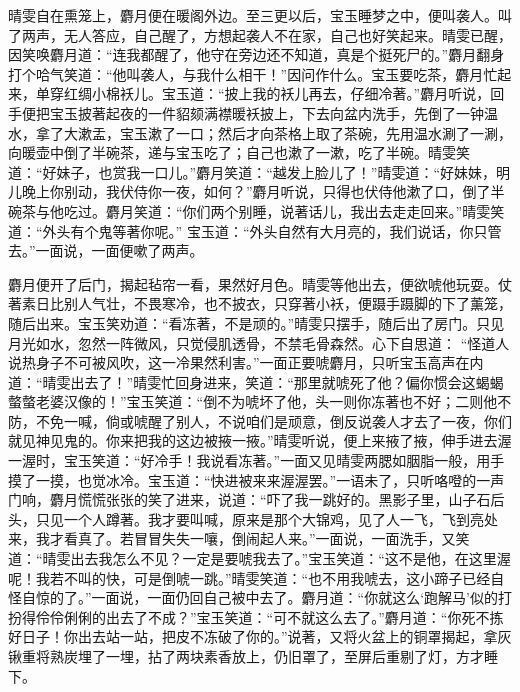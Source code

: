 \begin{parag}


    晴雯自在熏笼上，麝月便在暖阁外边。至三更以后，宝玉睡梦之中，便叫袭人。叫了两声，无人答应，自己醒了，方想起袭人不在家，自己也好笑起来。晴雯已醒，因笑唤麝月道：“连我都醒了，他守在旁边还不知道，真是个挺死尸的。”麝月翻身打个哈气笑道：“他叫袭人，与我什么相干！”因问作什么。宝玉要吃茶，麝月忙起来，单穿红绸小棉袄儿。宝玉道：“披上我的袄儿再去，仔细冷著。”麝月听说，回手便把宝玉披著起夜的一件貂颏满襟暖袄披上，下去向盆内洗手，先倒了一钟温水，拿了大漱盂，宝玉漱了一口；然后才向茶格上取了茶碗，先用温水涮了一涮，向暖壶中倒了半碗茶，递与宝玉吃了；自己也漱了一漱，吃了半碗。晴雯笑道：“好妹子，也赏我一口儿。”麝月笑道：“越发上脸儿了！”晴雯道：“好妹妹，明儿晚上你别动，我伏侍你一夜，如何？”麝月听说，只得也伏侍他漱了口，倒了半碗茶与他吃过。麝月笑道：“你们两个别睡，说著话儿，我出去走走回来。”晴雯笑道：“外头有个鬼等著你呢。” 宝玉道：“外头自然有大月亮的，我们说话，你只管去。”一面说，一面便嗽了两声。
\end{parag}


\begin{parag}


    麝月便开了后门，揭起毡帘一看，果然好月色。晴雯等他出去，便欲唬他玩耍。仗著素日比别人气壮，不畏寒冷，也不披衣，只穿著小袄，便蹑手蹑脚的下了薰笼，随后出来。宝玉笑劝道：“看冻著，不是顽的。”晴雯只摆手，随后出了房门。只见月光如水，忽然一阵微风，只觉侵肌透骨，不禁毛骨森然。心下自思道： “怪道人说热身子不可被风吹，这一冷果然利害。”一面正要唬麝月，只听宝玉高声在内道：“晴雯出去了！”晴雯忙回身进来，笑道：“那里就唬死了他？偏你惯会这蝎蝎螫螫老婆汉像的！”宝玉笑道：“倒不为唬坏了他，头一则你冻著也不好；二则他不防，不免一喊，倘或唬醒了别人，不说咱们是顽意，倒反说袭人才去了一夜，你们就见神见鬼的。你来把我的这边被掖一掖。”晴雯听说，便上来掖了掖，伸手进去渥一渥时，宝玉笑道：“好冷手！我说看冻著。”一面又见晴雯两腮如胭脂一般，用手摸了一摸，也觉冰冷。宝玉道：“快进被来来渥渥罢。”一语未了，只听咯噔的一声门响，麝月慌慌张张的笑了进来，说道：“吓了我一跳好的。黑影子里，山子石后头，只见一个人蹲著。我才要叫喊，原来是那个大锦鸡，见了人一飞，飞到亮处来，我才看真了。若冒冒失失一嚷，倒闹起人来。”一面说，一面洗手，又笑道：“晴雯出去我怎么不见？一定是要唬我去了。”宝玉笑道：“这不是他，在这里渥呢！我若不叫的快，可是倒唬一跳。”晴雯笑道：“也不用我唬去，这小蹄子已经自怪自惊的了。”一面说，一面仍回自己被中去了。麝月道：“你就这么‘跑解马’似的打扮得伶伶俐俐的出去了不成？”宝玉笑道：“可不就这么去了。”麝月道：“你死不拣好日子！你出去站一站，把皮不冻破了你的。”说著，又将火盆上的铜罩揭起，拿灰锹重将熟炭埋了一埋，拈了两块素香放上，仍旧罩了，至屏后重剔了灯，方才睡下。
\end{parag}


